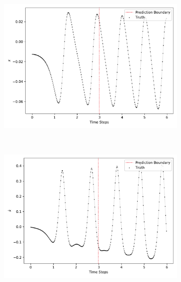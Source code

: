 		\begin{figure}
			\centering
			\begin{subfigure}{0.5\linewidth}
				\centering
				\includegraphics[width=\linewidth]{figures/experiments/environments/observations-cartpole-gym-N0-D0.pdf}
			\end{subfigure}%
			~
			\begin{subfigure}{0.5\linewidth}
				\centering
				\includegraphics[width=\linewidth]{figures/experiments/environments/observations-cartpole-gym-N0-D1.pdf}
			\end{subfigure} \\
			\begin{subfigure}{0.5\linewidth}
				\centering

\end{subfigure}
\end{figure}
